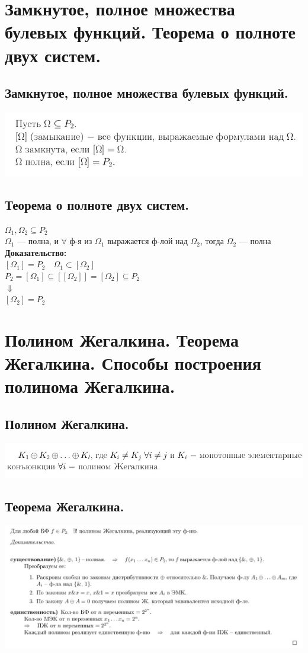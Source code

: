 \documentclass[12pt]{article}
\begin{document}
\section{Замкнутое, полное множества булевых функций. Теорема о полноте двух систем.}
\subsection{Замкнутое, полное множества булевых функций.}
	\includegraphics[width=400pt]{21}
\subsection{Теорема о полноте двух систем.}
	$\Omega_1, \Omega_2 \subseteq P_2$\\
	$\Omega_1$ — полна, и $\forall$ ф-я из $\Omega_1$ выражается ф-лой над $\Omega_2$, тогда $\Omega_2$ — полна\\
	\textbf{Доказательство:}\\
		$[\Omega_1] = P_2 \quad \Omega_1 \subset [\Omega_2]$\\
		$P_2 = [\Omega_1] \subseteq [[\Omega_2]] = [\Omega_2] \subseteq P_2$\\
		$\Downarrow$\\
		$[\Omega_2] = P_2$\\
	\qedsymbol

\section{Полином Жегалкина. Теорема Жегалкина. Способы построения полинома Жегалкина.}
\subsection{Полином Жегалкина.}
	\includegraphics[width=500pt]{22}
\subsection{Теорема Жегалкина.}
	\includegraphics[width=550pt]{23}
\end{document}
